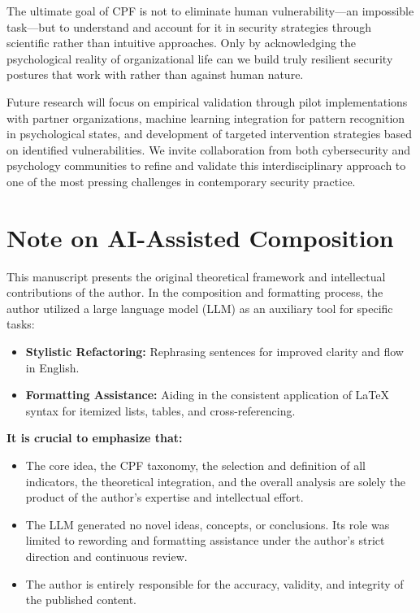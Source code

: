 \documentclass[11pt,a4paper]{article}
\begin{document}
The ultimate goal of CPF is not to eliminate human vulnerability—an impossible task—but to understand and account for it in security strategies through scientific rather than intuitive approaches. Only by acknowledging the psychological reality of organizational life can we build truly resilient security postures that work with rather than against human nature.

Future research will focus on empirical validation through pilot implementations with partner organizations, machine learning integration for pattern recognition in psychological states, and development of targeted intervention strategies based on identified vulnerabilities. We invite collaboration from both cybersecurity and psychology communities to refine and validate this interdisciplinary approach to one of the most pressing challenges in contemporary security practice.

\section*{Note on AI-Assisted Composition}
\label{sec:ai_declaration}

This manuscript presents the original theoretical framework and intellectual contributions of the author. In the composition and formatting process, the author utilized a large language model (LLM) as an auxiliary tool for specific tasks:

\begin{itemize}
    \item \textbf{Stylistic Refactoring:} Rephrasing sentences for improved clarity and flow in English.
    \item \textbf{Formatting Assistance:} Aiding in the consistent application of LaTeX syntax for itemized lists, tables, and cross-referencing.
\end{itemize}

\noindent \textbf{It is crucial to emphasize that:}
\begin{itemize}
    \item The core idea, the CPF taxonomy, the selection and definition of all indicators, the theoretical integration, and the overall analysis are solely the product of the author's expertise and intellectual effort.
    \item The LLM generated no novel ideas, concepts, or conclusions. Its role was limited to rewording and formatting assistance under the author's strict direction and continuous review.
    \item The author is entirely responsible for the accuracy, validity, and integrity of the published content.
\end{itemize}
\end{document}

